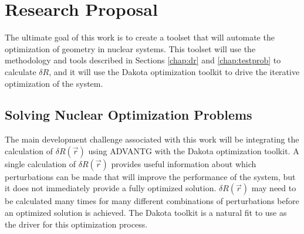 \chapter{Research Proposal}
\label{chap:proposal}


The ultimate goal of this work is to create a toolset that will automate the optimization of geometry in nuclear systems.
This toolset will use the methodology and tools described in Sections \ref{chap:dr} and \ref{chap:testprob} to calculate $\delta R$, and it will use the Dakota optimization toolkit to drive the iterative optimization of the system.

\section{Solving Nuclear Optimization Problems}
\label{sec:proposal:solving_nuclear_optimization_problems}

The main development challenge associated with this work will be integrating the calculation of $\delta R\left(\vec{r}\right)$ using ADVANTG with the Dakota optimization toolkit.
A single calculation of $\delta R\left(\vec{r}\right)$ provides useful information about which perturbations can be made that will improve the performance of the system, but it does not immediately provide a fully optimized solution.
$\delta R\left(\vec{r}\right)$ may need to be calculated many times for many different combinations of perturbations before an optimized solution is achieved.
The Dakota toolkit is a natural fit to use as the driver for this optimization process.

